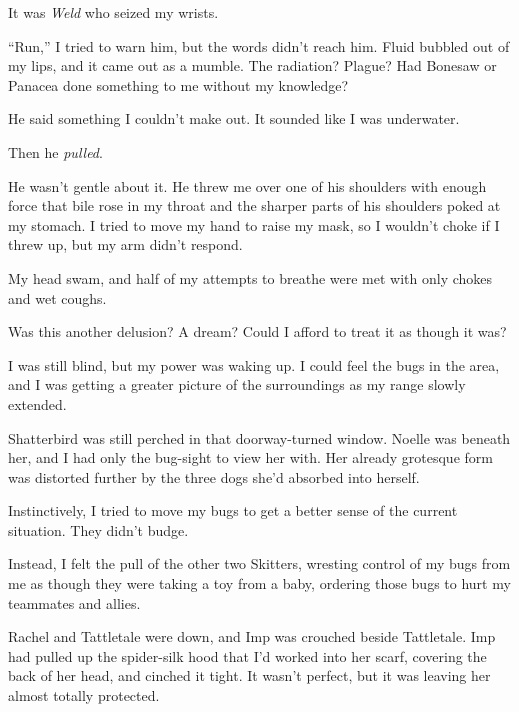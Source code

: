 It was \emph{Weld} who seized my wrists.



``Run,'' I tried to warn him, but the words didn't reach him.  Fluid bubbled out of my lips, and it came out as a mumble.  The radiation?  Plague?  Had Bonesaw or Panacea done something to me without my knowledge?



He said something I couldn't make out.  It sounded like I was underwater.



Then he \emph{pulled}.



He wasn't gentle about it.  He threw me over one of his shoulders with enough force that bile rose in my throat and the sharper parts of his shoulders poked at my stomach.  I tried to move my hand to raise my mask, so I wouldn't choke if I threw up, but my arm didn't respond.



My head swam, and half of my attempts to breathe were met with only chokes and wet coughs.



Was this another delusion?  A dream?  Could I afford to treat it as though it was?



I was still blind, but my power was waking up.  I could feel the bugs in the area, and I was getting a greater picture of the surroundings as my range slowly extended.



Shatterbird was still perched in that doorway-turned window.  Noelle was beneath her, and I had only the bug-sight to view her with.  Her already grotesque form was distorted further by the three dogs she'd absorbed into herself.



Instinctively, I tried to move my bugs to get a better sense of the current situation.  They didn't budge.



Instead, I felt the pull of the other two Skitters, wresting control of my bugs from me as though they were taking a toy from a baby, ordering those bugs to hurt my teammates and allies.



Rachel and Tattletale were down, and Imp was crouched beside Tattletale.  Imp had pulled up the spider-silk hood that I'd worked into her scarf, covering the back of her head, and cinched it tight.  It wasn't perfect, but it was leaving her almost totally protected.




